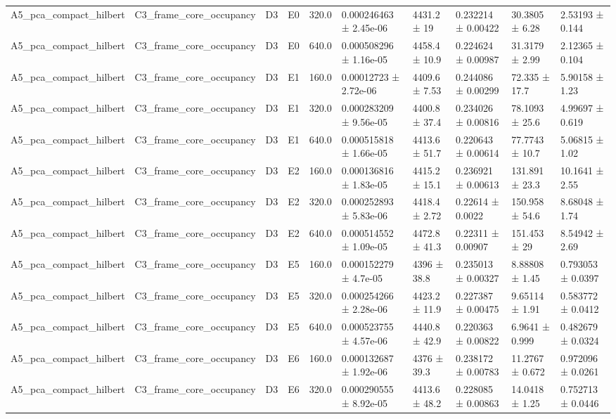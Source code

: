 \begin{table}
\begin{tabular}{llllllllll}
A5\_pca\_compact\_hilbert & C3\_frame\_core\_occupancy & D3 & E0 & 320.0 & 0.000246463 ± 2.45e-06 & 4431.2 ± 19 & 0.232214 ± 0.00422 & 30.3805 ± 6.28 & 2.53193 ± 0.144 \\
A5\_pca\_compact\_hilbert & C3\_frame\_core\_occupancy & D3 & E0 & 640.0 & 0.000508296 ± 1.16e-05 & 4458.4 ± 10.9 & 0.224624 ± 0.00987 & 31.3179 ± 2.99 & 2.12365 ± 0.104 \\
A5\_pca\_compact\_hilbert & C3\_frame\_core\_occupancy & D3 & E1 & 160.0 & 0.00012723 ± 2.72e-06 & 4409.6 ± 7.53 & 0.244086 ± 0.00299 & 72.335 ± 17.7 & 5.90158 ± 1.23 \\
A5\_pca\_compact\_hilbert & C3\_frame\_core\_occupancy & D3 & E1 & 320.0 & 0.000283209 ± 9.56e-05 & 4400.8 ± 37.4 & 0.234026 ± 0.00816 & 78.1093 ± 25.6 & 4.99697 ± 0.619 \\
A5\_pca\_compact\_hilbert & C3\_frame\_core\_occupancy & D3 & E1 & 640.0 & 0.000515818 ± 1.66e-05 & 4413.6 ± 51.7 & 0.220643 ± 0.00614 & 77.7743 ± 10.7 & 5.06815 ± 1.02 \\
A5\_pca\_compact\_hilbert & C3\_frame\_core\_occupancy & D3 & E2 & 160.0 & 0.000136816 ± 1.83e-05 & 4415.2 ± 15.1 & 0.236921 ± 0.00613 & 131.891 ± 23.3 & 10.1641 ± 2.55 \\
A5\_pca\_compact\_hilbert & C3\_frame\_core\_occupancy & D3 & E2 & 320.0 & 0.000252893 ± 5.83e-06 & 4418.4 ± 2.72 & 0.22614 ± 0.0022 & 150.958 ± 54.6 & 8.68048 ± 1.74 \\
A5\_pca\_compact\_hilbert & C3\_frame\_core\_occupancy & D3 & E2 & 640.0 & 0.000514552 ± 1.09e-05 & 4472.8 ± 41.3 & 0.22311 ± 0.00907 & 151.453 ± 29 & 8.54942 ± 2.69 \\
A5\_pca\_compact\_hilbert & C3\_frame\_core\_occupancy & D3 & E5 & 160.0 & 0.000152279 ± 4.7e-05 & 4396 ± 38.8 & 0.235013 ± 0.00327 & 8.88808 ± 1.45 & 0.793053 ± 0.0397 \\
A5\_pca\_compact\_hilbert & C3\_frame\_core\_occupancy & D3 & E5 & 320.0 & 0.000254266 ± 2.28e-06 & 4423.2 ± 11.9 & 0.227387 ± 0.00475 & 9.65114 ± 1.91 & 0.583772 ± 0.0412 \\
A5\_pca\_compact\_hilbert & C3\_frame\_core\_occupancy & D3 & E5 & 640.0 & 0.000523755 ± 4.57e-06 & 4440.8 ± 42.9 & 0.220363 ± 0.00822 & 6.9641 ± 0.999 & 0.482679 ± 0.0324 \\
A5\_pca\_compact\_hilbert & C3\_frame\_core\_occupancy & D3 & E6 & 160.0 & 0.000132687 ± 1.92e-06 & 4376 ± 39.3 & 0.238172 ± 0.00783 & 11.2767 ± 0.672 & 0.972096 ± 0.0261 \\
A5\_pca\_compact\_hilbert & C3\_frame\_core\_occupancy & D3 & E6 & 320.0 & 0.000290555 ± 8.92e-05 & 4413.6 ± 48.2 & 0.228085 ± 0.00863 & 14.0418 ± 1.25 & 0.752713 ± 0.0446 \\

\end{tabular}
\end{table}
